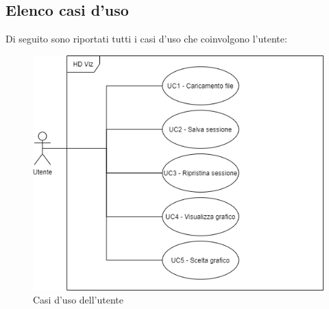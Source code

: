 \subsection{Elenco casi d'uso}
Di seguito sono riportati tutti i casi d'uso che coinvolgono l'utente:
\begin{figure}[h]
\includegraphics[width=\linewidth]{section/Images/HDviz.png}
\centering
\caption{Casi d'uso dell'utente}
\end{figure}







